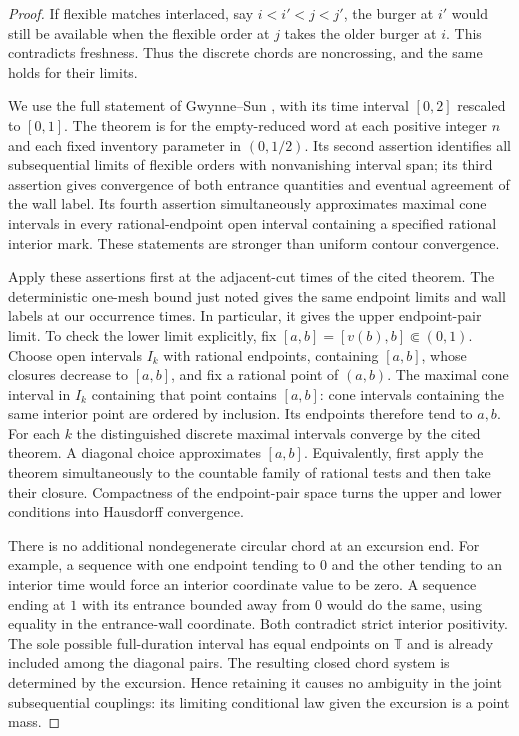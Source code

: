 \begin{proof}
If flexible matches interlaced, say $i<i'<j<j'$, the burger at $i'$ would
still be available when the flexible order at $j$ takes the older burger
at $i$.  This contradicts freshness.  Thus the discrete chords are
noncrossing, and the same holds for their limits.

We use the full statement of Gwynne--Sun
\cite[Theorem~1.11]{GwynneSunFKIII}, with its time interval $[0,2]$ rescaled to
$[0,1]$.  The theorem is for the empty-reduced word at each positive
integer $n$ and each fixed inventory parameter in $(0,1/2)$.  Its second
assertion identifies all subsequential limits of flexible orders with
nonvanishing interval span; its third assertion gives convergence of both
entrance quantities and eventual agreement of the wall label.  Its fourth
assertion simultaneously approximates maximal cone intervals in every
rational-endpoint open interval containing a specified rational interior
mark.  These statements are stronger than uniform contour convergence.

Apply these assertions first at the adjacent-cut times of the cited
theorem.  The deterministic one-mesh bound just noted gives the same
endpoint limits and wall labels at our occurrence times.  In particular,
it gives the upper endpoint-pair limit.  To check the lower
limit explicitly, fix $[a,b]=[v(b),b]\Subset(0,1)$.  Choose open intervals
$I_k$ with rational endpoints, containing $[a,b]$, whose closures decrease
to $[a,b]$, and fix a rational point of $(a,b)$.  The maximal cone interval
in $I_k$ containing that point contains $[a,b]$: cone intervals containing
the same interior point are ordered by inclusion.  Its endpoints
therefore tend to $a,b$.  For each $k$ the distinguished discrete maximal
intervals converge by the cited theorem.  A diagonal choice approximates
$[a,b]$.  Equivalently, first apply the theorem simultaneously to the
countable family of rational tests and then take their closure.  Compactness
of the endpoint-pair space turns the upper and lower conditions into
Hausdorff convergence.

There is no additional nondegenerate circular chord at an excursion end.
For example, a sequence with one endpoint tending to $0$ and the other
tending to an interior time would force an interior coordinate value to
be zero.  A sequence ending at $1$ with its entrance bounded away from $0$
would do the same, using equality in the entrance-wall coordinate.  Both
contradict strict interior positivity.  The sole possible full-duration
interval has equal endpoints on $\mathbb T$ and is already included among
the diagonal pairs.  The resulting closed chord system is determined by
the excursion.  Hence retaining it causes no ambiguity in the joint
subsequential couplings: its limiting conditional law given the excursion
is a point mass.
\end{proof}


